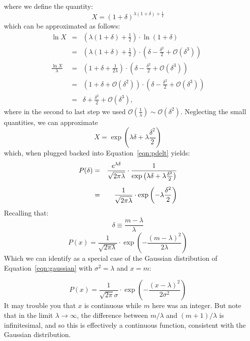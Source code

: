 \documentclass[12pt,oneside]{book}
\begin{document}
where we define the quantity:
\begin{displaymath}
X = (1+\delta)^{\lambda(1+\delta)+\frac{1}{2}}
\end{displaymath}
which can be approximated as follows:
\begin{eqnarray*}
\ln X &=& \left( \lambda (1+\delta) + \frac{1}{2} \right) \cdot \ln(1+\delta) \\[5pt]
&=& \left( \lambda (1+\delta) + \frac{1}{2} \right) \cdot \left( \delta - \frac{\delta^2}{2} + \mathcal{O}(\delta^3)\right) \\[5pt]
\frac{\ln X}{\lambda}&=& \left( 1+\delta + \frac{1}{2\lambda} \right) \cdot \left( \delta - \frac{\delta^2}{2} + \mathcal{O}(\delta^3)\right) \\[5pt]
&=& \left( 1+\delta + \mathcal{O}\left(\delta^2\right) \right) \cdot \left( \delta - \frac{\delta^2}{2} + \mathcal{O}(\delta^3)\right) \\[5pt]
&=& \delta + \frac{\delta^2}{2}+ \mathcal{O}(\delta^3),
\end{eqnarray*}
where in the second to last step we used $\mathcal{O}\left(\frac{1}{\lambda}\right) \sim \mathcal{O}\left(\delta^2\right)$.  Neglecting the small quantities, we can approximate
\begin{displaymath}
X = \exp\left( \lambda\delta + \lambda\frac{\delta^2}{2} \right) 
\end{displaymath}
which, when plugged backed into Equation~\ref{eqn:pdelt} yields:
\begin{eqnarray}
\label{eqn:almost}
P(\delta) &=& \frac{e^{\lambda\delta}}{\sqrt{2\pi\lambda}} \cdot \frac{1}{\exp\left( \lambda\delta + \lambda\frac{\delta^2}{2} \right)} \notag \\[5pt]
&=& \frac{1}{\sqrt{2\pi\lambda}} \cdot \exp\left( -\lambda \frac{\delta^2}{2}\right)
\end{eqnarray}
Recalling that:
\begin{displaymath}
\delta \equiv \frac{m - \lambda}{\lambda} 
\end{displaymath}
\begin{equation}
P(x) = \frac{1}{\sqrt{2\pi \lambda}} \cdot \exp\left( - \frac{(m - \lambda)^2}{2 \lambda}\right)
\end{equation}
Which we can identify as a special case of the Gaussian distribution of Equation~\ref{eqn:gaussian} with 
$\sigma^2 = \lambda$ and $x = m$:

\begin{equation*}
P(x) = \frac{1}{\sqrt{2\pi} \sigma} \cdot \exp\left( - \frac{(x - \lambda)^2}{2 \sigma^2}\right)
\end{equation*}
It may trouble you that $x$ is continuous while $m$ here was an integer.  But note that in the limit 
$\lambda \to \infty$, the difference between $m/\lambda$ and $(m+1)/\lambda$ is infinitesimal, and so this is effectively a continuous function, consistent with the Gaussian distribution.
\end{document}
